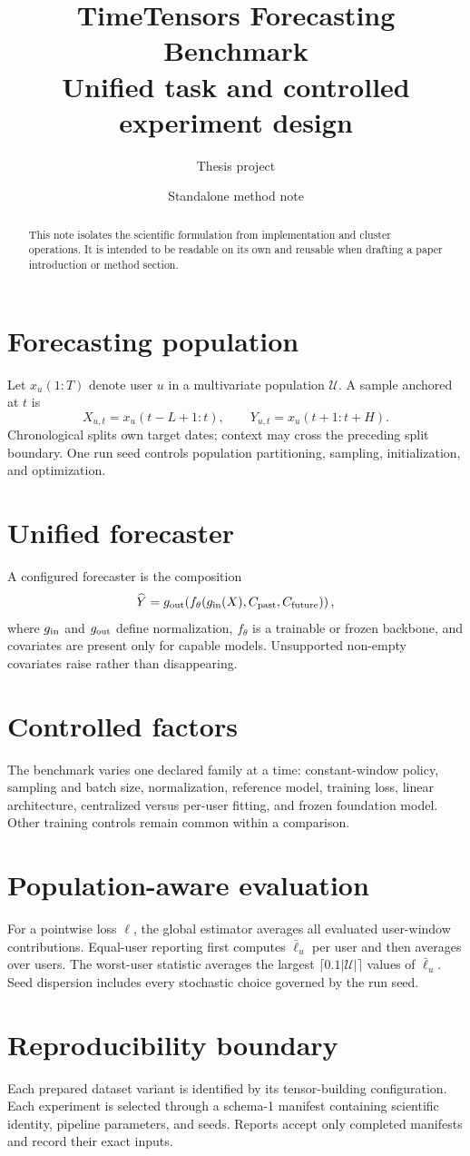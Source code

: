 \documentclass[10pt]{article}
\title{\color{navy}TimeTensors Forecasting Benchmark\\[3pt]\large Unified task and controlled experiment design}
\author{Thesis project}
\date{Standalone method note}
\begin{document}
\maketitle
\begin{abstract}
This note isolates the scientific formulation from implementation and cluster
operations. It is intended to be readable on its own and reusable when drafting
a paper introduction or method section.
\end{abstract}

\section{Forecasting population}
Let $x_u(1{:}T)$ denote user $u$ in a multivariate population
$\mathcal U$. A sample anchored at $t$ is
\[
 X_{u,t}=x_u(t-L+1{:}t),\qquad
 Y_{u,t}=x_u(t+1{:}t+H).
\]
Chronological splits own target dates; context may cross the preceding split
boundary. One run seed controls population partitioning, sampling,
initialization, and optimization.

\section{Unified forecaster}
A configured forecaster is the composition
\[
 \widehat Y=g_{\rm out}\!\left(
 f_\theta(g_{\rm in}(X),C_{\rm past},C_{\rm future})\right),
\]
where $g_{\rm in}$ and $g_{\rm out}$ define normalization, $f_\theta$ is a
trainable or frozen backbone, and covariates are present only for capable
models. Unsupported non-empty covariates raise rather than disappearing.

\section{Controlled factors}
The benchmark varies one declared family at a time: constant-window policy,
sampling and batch size, normalization, reference model, training loss, linear
architecture, centralized versus per-user fitting, and frozen foundation
model. Other training controls remain common within a comparison.

\section{Population-aware evaluation}
For a pointwise loss $\ell$, the global estimator averages all evaluated
user-window contributions. Equal-user reporting first computes
$\bar\ell_u$ per user and then averages over users. The worst-user statistic
averages the largest $\lceil0.1|\mathcal U|\rceil$ values of $\bar\ell_u$.
Seed dispersion includes every stochastic choice governed by the run seed.

\section{Reproducibility boundary}
Each prepared dataset variant is identified by its tensor-building
configuration. Each experiment is selected through a schema-1 manifest
containing scientific identity, pipeline parameters, and seeds. Reports accept
only completed manifests and record their exact inputs.
\end{document}
